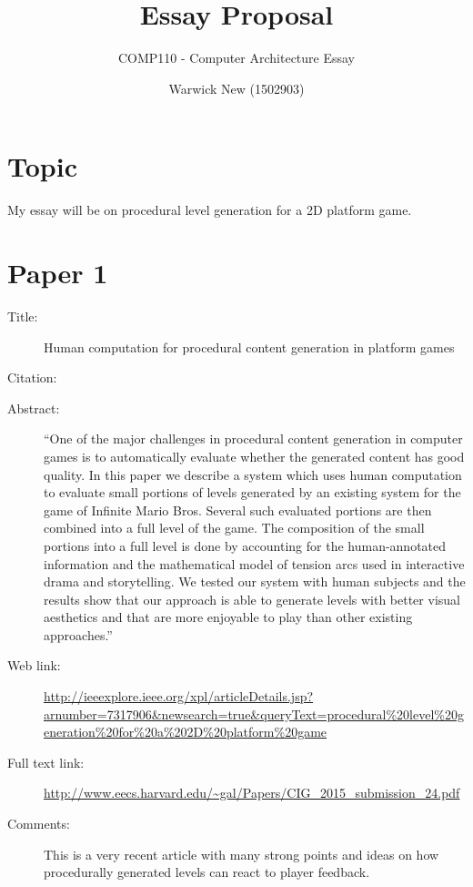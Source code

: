 \documentclass{scrartcl}
\title{Essay Proposal}
\subtitle{COMP110 - Computer Architecture Essay}
\author{Warwick New (1502903)}
\begin{document}
\maketitle

\section*{Topic}

My essay will be on
procedural level generation for a 2D platform game.

\section*{Paper 1}
\begin{description}
\item[Title:] 
Human computation for procedural content generation in platform games
\item[Citation:] \cite{Reis}
\item[Abstract:] ``One of the major challenges in procedural content generation in computer games is to automatically evaluate whether the generated content has good quality. In this paper we describe a system which uses human computation to evaluate small portions of levels generated by an existing system for the game of Infinite Mario Bros. Several such evaluated portions are then combined into a full level of the game. The composition of the small portions into a full level is done by accounting for the human-annotated information and the mathematical model of tension arcs used in interactive drama and storytelling. We tested our system with human subjects and the results show that our approach is able to generate levels with better visual aesthetics and that are more enjoyable to play than other existing approaches.''
\item[Web link:] \url{http://ieeexplore.ieee.org/xpl/articleDetails.jsp?arnumber=7317906&newsearch=true&queryText=procedural\%20level\%20generation\%20for\%20a\%202D\%20platform\%20game}
\item[Full text link:] \url{http://www.eecs.harvard.edu/~gal/Papers/CIG_2015_submission_24.pdf}
\item[Comments:] This is a very recent article with many strong points and ideas on how procedurally generated levels can react to player feedback.
\end{description}
\end{document}

